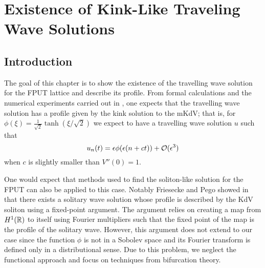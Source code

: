 \chapter{Existence of Kink-Like Traveling Wave Solutions}
\label{chp:existence}
\pagestyle{myheadings}

\section{Introduction}
The goal of this chapter is to show the existence of the travelling wave solution for the FPUT lattice and describe its profile. From formal calculations and the numerical experiments carried out in \cite{pace2019beta}, one expects that the travelling wave solution has a profile given by the kink solution to the mKdV; that is, for \(\phi(\xi) = \frac 1 {\sqrt 2} \tanh(\xi/\sqrt 2)\) we expect to have a travelling wave solution \(u\) such that 
\begin{equation}\label{formal-approximation}
	u_n(t) = \epsilon \phi(\epsilon(n + ct)) +\mathcal{O}(\epsilon^3)
\end{equation}
when \(c\) is slightly smaller than \(V''(0) = 1\).

One would expect that methods used to find the soliton-like solution for the FPUT can also be applied to this case. Notably Friesecke and Pego showed in \cite{friesecke1999solitary} that there exists a solitary wave solution whose profile is described by the KdV soliton using a fixed-point argument. The argument relies on creating a map from \(H^1(\mathbb{R})\) to itself using Fourier multipliers such that the fixed point of the map is the profile of the solitary wave. However, this argument does not extend to our case since the function \(\phi\) is not in a Sobolev space and its Fourier transform is defined only in a distributional sense. Due to this problem, we neglect the functional approach and focus on techniques from bifurcation theory. 



